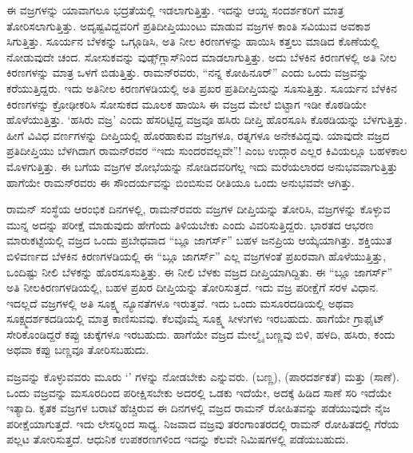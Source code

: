 ಈ ವಜ್ರಗಳನ್ನು ಯಾವಾಗಲೂ ಭದ್ರತೆಯಲ್ಲಿ ಇಡಲಾಗುತ್ತಿತ್ತು. ಇದನ್ನು ಆಯ್ದ ಸಂದರ್ಶಕರಿಗೆ ಮಾತ್ರ ತೋರಿಸಲಾಗುತ್ತಿತ್ತು. ಅದೃಷ್ಟವಿದ್ದವರಿಗೆ ಪ್ರತಿದೀಪ್ತಿಯುಂಟು ಮಾಡುವ ವಜ್ರಗಳ ಕಾಂತಿ ಸವಿಯುವ ಅವಕಾಶ ಸಿಗುತ್ತಿತ್ತು. ಸೂರ್ಯನ ಬೆಳಕನ್ನು ಒಗ್ಗೂಡಿಸಿ, ಅತಿ ನೀಲ ಕಿರಣಗಳನ್ನು ಹಾಯಿಸಿ ಕತ್ತಲು ಮಾಡಿದ ಕೊಣೆಯಲ್ಲಿ ನೋಡುವುದೇ ಚಂದ. ಸೋಸುಕವನ್ನು ವುಡ್ಸ್‌ಗ್ಲಾಸ್‍ನಿಂದ ಮಾಡಲಾಗುತ್ತಿತ್ತು. ಅದು ಬೆಳಕಿನ ಕಿರಣಗಳಲ್ಲಿ ಅತಿ ನೀಲ ಕಿರಣಗಳನ್ನು ಮಾತ್ರ ಒಳಗೆ ಬಿಡುತ್ತಿತ್ತು. ರಾಮನ್‍ರವರು, “ನನ್ನ ಕೋಹಿನೂರ್” ಎಂದು ಒಂದು ವಜ್ರವನ್ನು ಕರೆಯುತ್ತಿದ್ದರು. ಇದು ಅತಿನೀಲ ಕಿರಣಗಳಡಿಯಲ್ಲಿ ಅತಿ ಪ್ರಖರ ಪ್ರತಿದೀಪ್ತಿಯನ್ನು ಸೂಸುತ್ತಿತ್ತು. ಸೂರ್ಯನ ಬೆಳಕಿನ ಕಿರಣಗಳನ್ನು ಕ್ರೋಢೀಕರಿಸಿ ಸೋಸುಕದ ಮೂಲಕ ಹಾಯಿಸಿ ಈ ವಜ್ರದ ಮೇಲೆ ಬಿಟ್ಟಾಗ ಇಡೀ ಕೊಠಡಿಯೇ ಹೊಳೆಯುತ್ತಿತ್ತು. ‘ಹಸಿರು ವಜ್ರ’ ಎಂದು ಹೆಸರಿಟ್ಟಿದ್ದ ವಜ್ರವೂ ಹಸಿರು ದೀಪ್ತಿ ಹೊರಸೂಸಿ ಕೊಠಡಿಯನ್ನು ಬೆಳಗುತ್ತಿತ್ತು. ಹೀಗೆ ವಿವಿಧ ವರ್ಣಗಳನ್ನು ದೀಪ್ತಿಯಲ್ಲಿ ಹೊರಹಾಕುವ ವಜ್ರಗಳೂ, ರತ್ನಗಳೂ ಅನೇಕವಿದ್ದವು. ಯಾವುದೇ ವಜ್ರದ ಪ್ರತಿದೀಪ್ತಿಯು ಬೆಳಗಿದಾಗ ರಾಮನ್‍ರವರ “ಇದು ಸುಂದರವಲ್ಲವೇ”! ಎಂಬ ಉದ್ಗಾರ ಎಲ್ಲರ ಕಿವಿಯಲ್ಲೂ ಬಹಳಕಾಲ ಮೊಳಗುತ್ತಿತ್ತು. ಈ ಬಗೆಯ ವಜ್ರಗಳ ಶೋಭೆಯನ್ನು ನೋಡಿದವರಿಗೆಲ್ಲ ಇದು ಮರೆಯಲಾರದ ಅನುಭವವಾಗುತ್ತಿತ್ತು ಹಾಗೆಯೇ ರಾಮನ್‍ರವರು ಈ ಸೌಂದರ್ಯವನ್ನು ಬಿಂಬಿಸುವ ರೀತಿಯೂ ಒಂದು ಅನುಭವವೇ ಆಗಿತ್ತು.

ರಾಮನ್ ಸಂಸ್ಥೆಯ ಆರಂಭಿಕ ದಿನಗಳಲ್ಲಿ, ರಾಮನ್‍ರವರು ವಜ್ರಗಳ ದೀಪ್ತಿಯನ್ನು ತೋರಿಸಿ, ವಜ್ರಗಳನ್ನು ಕೊಳ್ಳುವ ಮುನ್ನ ಅದನ್ನು ಪರೀಕ್ಷೆ ಮಾಡುವುದು ಹೇಗೆಂದು ತಿಳಿಯಬೇಕು ಎಂದು ವಿವರಿಸುತ್ತಿದ್ದರು. ಭಾರತದ ಆಭರಣ ಮಾರುಕಟ್ಟೆಯಲ್ಲಿ ವಜ್ರದ ಒಂದು ಪ್ರಬೇಧವಾದ “ಬ್ಲೂ ಜಾಗರ್ಸ್” ಬಹಳ ಜನಪ್ರಿಯ ಆಯ್ಕೆಯಾಗಿತ್ತು. ಶಕ್ತಿಯುತ ಬಿಳಿವರ್ಣದ ಬೆಳಕಿನ ಕಿರಣಗಳಡಿಯಲ್ಲಿ ಈ “ಬ್ಲೂ ಜಾಗರ್ಸ್” ಎಲ್ಲ ವಜ್ರಗಳಂತೆ ಪ್ರಖರವಾಗಿ ಹೊಳೆಯುತ್ತಿತ್ತು, ಒಂದಿಷ್ಟು ನೀಲಿ ಬೆಳಕನ್ನು ಹೊರಸೂಸುತ್ತಿತ್ತು. ಈ ನೀಲಿ ಬೆಳಕು ವಜ್ರದ ದೀಪ್ತಿಯಾಗಿದ್ದಿತು. ಈ “ಬ್ಲೂ ಜಾಗರ್ಸ್” ಅತಿ ನೀಲಕಿರಣಗಳಡಿಯಲ್ಲಿ, ಬಹಳ ಪ್ರಖರ ದೀಪ್ತಿಯನ್ನು ತೋರಿಸುತ್ತದೆ. ಇದು ವಜ್ರ ಪರೀಕ್ಷೆಗೆ ಸರಳ ವಿಧಾನ. ಇದಲ್ಲದೆ ವಜ್ರಗಳಲ್ಲಿ ಅತಿ ಸೂಕ್ಷ್ಮ ನ್ಯೂನತೆಗಳೂ ಇರುತ್ತವೆ. ಇದು ಒಂದು ಮಸೂರದಡಿಯಲ್ಲಿ ಅಥವಾ ಸೂಕ್ಷ್ಮದರ್ಶಕದಡಿಯಲ್ಲಿ ಮಾತ್ರ ಕಾಣಿಸುವವು. ಕೆಲವೊಮ್ಮೆ ಸೂಕ್ಷ್ಮ ಸೀಳುಗಳು ಇರಬಹುದು. ಹಾಗೆಯೇ ಗ್ರಾಫೈಟ್ ಸೇರಿಕೊಂಡಿದ್ದರೆ ಕಪ್ಪು ಚುಕ್ಕೆಗಳೂ ಇರಬಹುದು. ಹಾಗೆಯೇ ವಜ್ರದ ಮೇಲ್ಮೈ ಬಣ್ಣವು ಬಿಳಿ, ಹಳದಿ, ಹಸಿರು, ಕಂದು ಅಥವಾ ಕಪ್ಪು ಬಣ್ಣವೂ ತೋರಿಸಬಹುದು.

ವಜ್ರವನ್ನು ಕೊಳ್ಳುವವರು ಮೂರು ‘’ ಗಳನ್ನು ನೋಡಬೇಕು ಎನ್ನುವರು.  (ಬಣ್ಣ),  (ಪಾರದರ್ಶಕತೆ) ಮತ್ತು  (ಸಾಣೆ). ಒಂದು ವಜ್ರವನ್ನು  ಮಸೂರದಿಂದ ಪರೀಕ್ಷಿಸಬೇಕು ಅದರಲ್ಲಿ ಒಡಕು ಇದೆಯೇ, ಅದಕ್ಕೆ ಹಿಡಿದ ಸಾಣೆ ಸರಿ ಇದೆಯೇ ಇತ್ಯಾದಿ. ಕೃತಕ ವಜ್ರಗಳ ಬರಾಟೆ ಹೆಚ್ಚಿರುವ ಈ ದಿನಗಳಲ್ಲಿ ವಜ್ರದ ರಾಮನ್ ರೋಹಿತವನ್ನು ಪಡೆಯುವುದೇ ನೈಜ ಪರೀಕ್ಷೆಯಾಗುತ್ತದೆ. ಇದು ಲೇಸರ್‍ನಿಂದ ಸಾಧ್ಯ. ನಿಜವಾದ ವಜ್ರವು  ತರಂಗಾಂತರದಲ್ಲಿ ರಾಮನ್ ರೋಹಿತದಲ್ಲಿ ಗೆರೆಯ ಪಲ್ಲಟ ತೋರಿಸುತ್ತದೆ. ಆಧುನಿಕ ಉಪಕರಣಗಳಿಂದ ಇದನ್ನು ಕೆಲವೇ ನಿಮಿಷಗಳಲ್ಲಿ ಪಡೆಯಬಹುದು.

